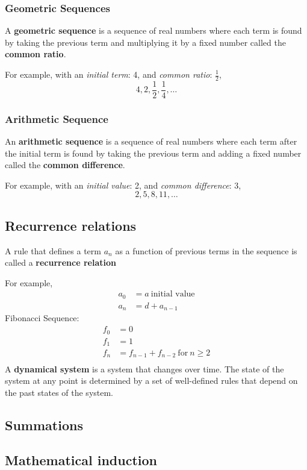 \subsubsection*{Geometric Sequences}
A \textbf{geometric sequence} is a sequence of real numbers where each term is found by taking
the previous term and multiplying it by a fixed number called the \textbf{common ratio}.

For example, with an \textit{initial term}: 4, and \textit{common ratio}: $\frac{1}{2}$,
\[
  4,2,\frac{1}{2},\frac{1}{4}, \ldots
\]
\subsubsection*{Arithmetic Sequence}
An \textbf{arithmetic sequence} is a sequence of real numbers where each term after the initial
term is found by taking the previous term and adding a fixed number called the \textbf{common difference}.

For example, with an \textit{initial value}: 2, and \textit{common difference}: 3,
\[
  2,5,8,11, \ldots
\]

\subsection{Recurrence relations}
A rule that defines a term $a_n$ as a function of previous terms in the sequence is called a
\textbf{recurrence relation}

For example,
\begin{align*}
  a_0 & = a~\text{initial value} \\
  a_n & = d + a_{n-1}
\end{align*}
Fibonacci Sequence:
\begin{align*}
  f_0 & = 0                                     \\
  f_1 & = 1                                     \\
  f_n & = f_{n-1} + f_{n-2}~\text{for}~n \geq 2 \\
\end{align*}
A \textbf{dynamical system} is a system that changes over time. The state of the system
at any point is determined by a set of well-defined rules that depend on the past states
of the system.

\subsection{Summations}


\subsection{Mathematical induction}


